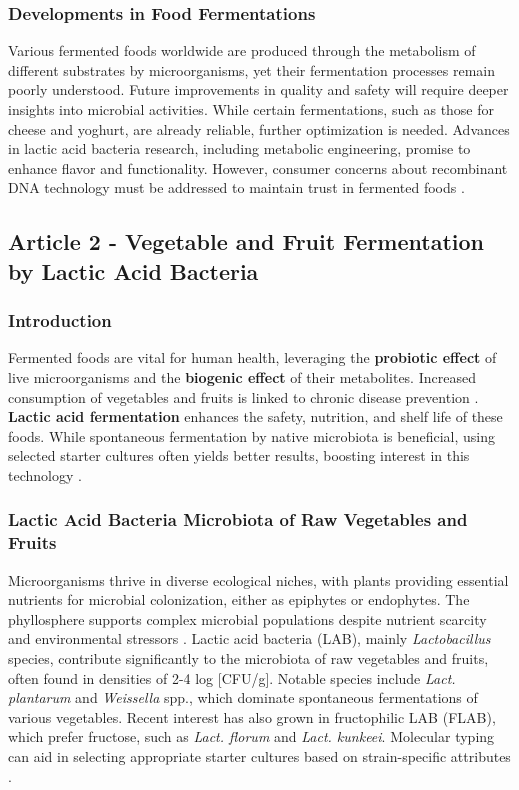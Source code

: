 \subsubsection*{Developments in Food Fermentations}
Various fermented foods worldwide are produced through the metabolism of different substrates by microorganisms, yet their fermentation processes remain poorly understood. Future improvements in quality and safety will require deeper insights into microbial activities. While certain fermentations, such as those for cheese and yoghurt, are already reliable, further optimization is needed. Advances in lactic acid bacteria research, including metabolic engineering, promise to enhance flavor and functionality. However, consumer concerns about recombinant DNA technology must be addressed to maintain trust in fermented foods \cite*{L8-MicroInFood}.

\subsection{Article 2 - Vegetable and Fruit Fermentation by Lactic Acid Bacteria }
\subsubsection*{Introduction}
Fermented foods are vital for human health, leveraging the \textbf{probiotic effect} of live microorganisms and the \textbf{biogenic effect} of their metabolites. Increased consumption of vegetables and fruits is linked to chronic disease prevention \cite*{L8-VegFruit}. \textbf{Lactic acid fermentation} enhances the safety, nutrition, and shelf life of these foods. While spontaneous fermentation by native microbiota is beneficial, using selected starter cultures often yields better results, boosting interest in this technology \cite*{L8-VegFruit}.

\subsubsection{Lactic Acid Bacteria Microbiota of Raw Vegetables and Fruits}
Microorganisms thrive in diverse ecological niches, with plants providing essential nutrients for microbial colonization, either as epiphytes or endophytes. The phyllosphere supports complex microbial populations despite nutrient scarcity and environmental stressors \cite*{L8-VegFruit}. Lactic acid bacteria (LAB), mainly \textit{Lactobacillus} species, contribute significantly to the microbiota of raw vegetables and fruits, often found in densities of 2-4 log [CFU/g]. Notable species include \textit{Lact. plantarum} and \textit{Weissella} spp., which dominate spontaneous fermentations of various vegetables. Recent interest has also grown in fructophilic LAB (FLAB), which prefer fructose, such as \textit{Lact. florum} and \textit{Lact. kunkeei}. Molecular typing can aid in selecting appropriate starter cultures based on strain-specific attributes \cite*{L8-VegFruit}.

